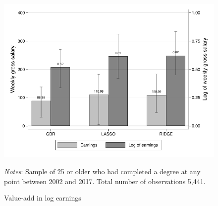 \documentclass[12pt, a4paper]{article}
\begin{document}
\begin{figure}[htbp]
\centering
\caption{Value-add in log earnings}
\vspace{0.5cm}
  \label{fig:valadlelog}
    \includegraphics{_figures/valad_levearn_log.pdf}
\parbox{1\textwidth}{\footnotesize{\textit{Notes}: Sample of 25 or older who had completed a degree at any point between 2002 and 2017. Total number of observations 5,441.}}
\end{figure}
%
%
%
\end{document}
